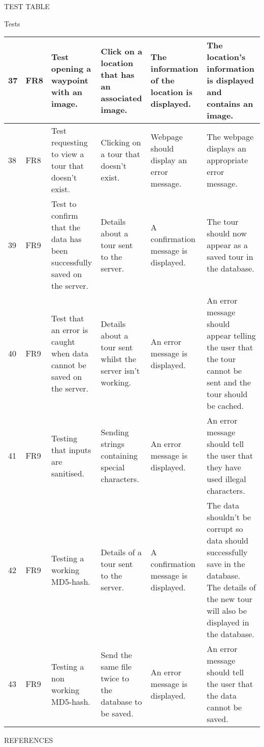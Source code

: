 \documentclass{article}
\begin{document}
\begin{section}{TEST TABLE}
\begin{subsection}{Tests}
\begin{tabularx}{\linewidth}{| p{0.7cm} | p{0.8cm} | p{3cm} | p{3.5cm} | X | X |}
37
&
FR8
&
Test opening a waypoint with an image.
&
Click on a location that has an associated image.
&
The information of the location is displayed.
&
The location's information is displayed and contains an image.
\\
\hline

38
&
FR8
&
Test requesting to view a tour that doesn't exist.
&
Clicking on a tour that doesn't exist.
&
Webpage should display  an error message.
&
The webpage displays an appropriate error message.
\\
\hline

39
&
FR9
&
Test to confirm that the data has been successfully saved on the server.
&
Details about a tour sent to the server.
&
A confirmation message is displayed. 
&
The tour should now appear as a saved tour in the database.
\\
\hline

40
&
FR9
&
Test that an error is caught when data cannot be saved  on the server.
&
Details about a tour sent whilst the server isn't working.
&
An error message is displayed.
&
An error message should appear telling the user that the tour cannot be sent and the tour should be cached.
\\
\hline

41
&
FR9
&
Testing that inputs are sanitised.
&
Sending strings containing special characters.
&
An error message is displayed.
&
An error message should tell the user that they have used illegal characters.
\\
\hline

42
&
FR9
&
Testing a working MD5-hash.
&
Details of a tour sent to the server.
&
A confirmation message is displayed.
&
The data shouldn't be corrupt so data should successfully save in the database. The details of the new tour will also be displayed in the database.
\\
\hline

43
&
FR9
&
Testing a non working MD5-hash.
&
Send the same file twice to the database to be saved.
&
An error message is displayed.
&
An error message should tell the user that the data cannot be saved.
\\
\hline

			\end{tabularx}
		\end{subsection}
	\end{section}
	
	\nocite{LaTeXTemplate}

	\newpage
	\begin{section}{REFERENCES}
		
		
	\end{section}
	
\end{document}
